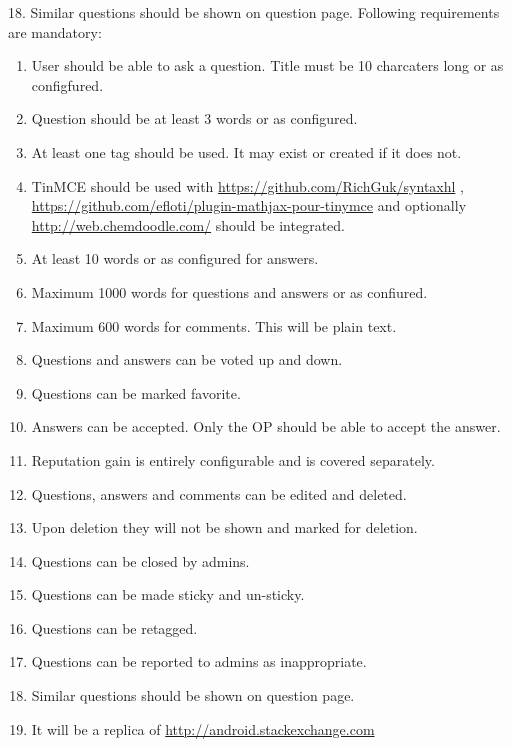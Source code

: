 \documentclass[letterpaper,10pt,english]{sphinxmanual}
\begin{document}
18. Similar questions should be shown on question page.
Following requirements are mandatory:
\begin{enumerate}
\item {} 
User should be able to ask a question. Title must be 10 charcaters long or
as configfured.

\item {} 
Question should be at least 3 words or as configured.

\item {} 
At least one tag should be used. It may exist or created if it does not.

\item {} 
TinMCE should be used with \href{https://github.com/RichGuk/syntaxhl}{https://github.com/RichGuk/syntaxhl} ,
\href{https://github.com/efloti/plugin-mathjax-pour-tinymce}{https://github.com/efloti/plugin-mathjax-pour-tinymce} and optionally
\href{http://web.chemdoodle.com/}{http://web.chemdoodle.com/} should be integrated.

\item {} 
At least 10 words or as configured for answers.

\item {} 
Maximum 1000 words for questions and answers or as confiured.

\item {} 
Maximum 600 words for comments. This will be plain text.

\item {} 
Questions and answers can be voted up and down.

\item {} 
Questions can be marked favorite.

\item {} 
Answers can be accepted. Only the OP should be able to accept the answer.

\item {} 
Reputation gain is entirely configurable and is covered separately.

\item {} 
Questions, answers and comments can be edited and deleted.

\item {} 
Upon deletion they will not be shown and marked for deletion.

\item {} 
Questions can be closed by admins.

\item {} 
Questions can be made sticky and un-sticky.

\item {} 
Questions can be retagged.

\item {} 
Questions can be reported to admins as inappropriate.

\item {} 
Similar questions should be shown on question page.

\item {} 
It will be a replica of \href{http://android.stackexchange.com}{http://android.stackexchange.com}

\end{enumerate}
\end{document}
